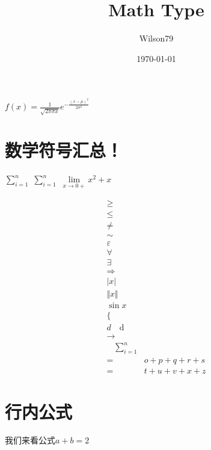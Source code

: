 \documentclass{article}
\title{Math Type}
\author{Wilson79}
\date{\today}
\begin{document}
 
    \tableofcontents %
    \maketitle %
    
    $f(x)=\frac{1}{\sqrt{2 \pi \sigma x}} e^{-\frac{(x-\mu)^{2}}{2 \sigma^{2}}}$

\section{数学符号汇总！}
    
    $\sum _{i=1}^{n}$ %
    $\sum \limits_{i=1}^{n}$
    $\lim\limits _{x \rightarrow 0+} x^2 + x$ 

    \[
    \begin{aligned} 
        \geq \\ %
        \leq \\ %
        \neq \\ %
        \sim \\ %
        \varepsilon \\
        \forall \\ %
        \exists \\ %
        \Rightarrow \\ 
        \vert x \vert \\ %
        \Vert x \Vert \\ %
        \sin x \\ %
        \{  \\  %
        d \quad \mathrm{d} \\ %
        \rightarrow \\ %
        \quad %
        \sum\limits_{i=1}^{n} \\ %
        =& o+p+q+r+s \\ 
        =& t+u+v+x+z 
    \end{aligned}
    \]
    

    

\section{行内公式} %
    我们来看公式$a+b=2$ %
\end{document}
